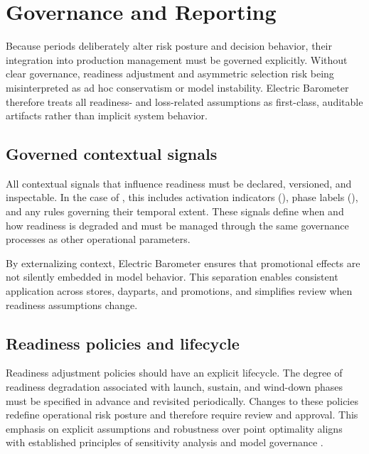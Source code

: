 
\section{Governance and Reporting}
\label{sec:governance}

Because \LTO{} periods deliberately alter risk posture and decision behavior, their integration into
production management must be governed explicitly. Without clear governance, readiness adjustment
and asymmetric selection risk being misinterpreted as ad hoc conservatism or model instability.
Electric Barometer therefore treats all readiness- and loss-related assumptions as first-class,
auditable artifacts rather than implicit system behavior.

\subsection{Governed contextual signals}
\label{subsec:governed-context}

All contextual signals that influence readiness must be declared, versioned, and inspectable. In the
case of \LTOs{}, this includes activation indicators (\ltoOn{}), phase labels (\ltoPhase{}), and any
rules governing their temporal extent. These signals define when and how readiness is degraded and
must be managed through the same governance processes as other operational parameters.

By externalizing \LTO{} context, Electric Barometer ensures that promotional effects are not
silently embedded in model behavior. This separation enables consistent application across stores,
dayparts, and promotions, and simplifies review when readiness assumptions change.

\subsection{Readiness policies and lifecycle}
\label{subsec:readiness-lifecycle}

Readiness adjustment policies should have an explicit lifecycle. The degree of readiness degradation
associated with \LTO{} launch, sustain, and wind-down phases must be specified in advance and
revisited periodically. Changes to these policies redefine operational risk posture and therefore
require review and approval. This emphasis on explicit assumptions and robustness over point
optimality aligns with established principles of sensitivity analysis and model governance
\citep{saltelli2008}.

